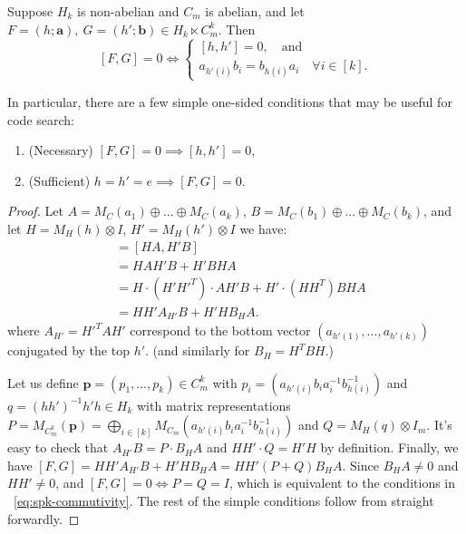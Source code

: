\begin{lemma}\label{lemma:spk-commutivity}
Suppose $H_k$ is non-abelian and $C_m$ is abelian, and let $F=(h;\mathbf a),\ G=(h';\mathbf b)\in H_k\ltimes C_m^{k}$. Then
\begin{equation}\label{eq:spk-commutivity}
[F,G]=0 \iff
\begin{cases}
    [h,h']=0, \quad \text{and} \\
    a_{h'(i)}b_i =b_{h(i)}a_i \quad \forall i\in[k].
\end{cases}
\end{equation}

In particular, there are a few simple one-sided conditions that may be useful for code search:
    \begin{enumerate}
    \item (Necessary) $[F,G]= 0\implies [h,h']= 0$,
    \item (Sufficient) $h=h'=e \implies [F,G]=0$.
    \end{enumerate}
\end{lemma}

\begin{proof}
    Let $A = M_C(a_1)\oplus ...\oplus M_C(a_k)$, $B =M_C(b_1)\oplus ...\oplus M_C(b_k)$, and let $H = M_H(h)\otimes I$, $H' = M_H(h')\otimes I$ we have:
    \begin{align*}
        [F,G] 
        &= [HA , H'B]\\
        &= HAH'B + H'BHA\\
        &= H\cdot(H'{H'}^{T}) \cdot AH' B  + H'\cdot(H  H^T)B HA\\
        &= HH' A_{H'}B + H'H B_HA.
    \end{align*}
    where $A_{H'}={H'}^{T} AH'$ correspond to the bottom vector $(a_{h'(1)},...,a_{h'(k)})$ conjugated by the top $h'$. %
    (and similarly for $B_H = H^TBH$.)

    Let us define $\textbf{p} = (p_1,...,p_k) \in C_m^k $ with $p_i = (a_{h'(i)}b_i a^{-1}_ib^{-1}_{h(i)})$ and $q = (hh')^{-1} h'h\in H_k$ with matrix representations $P = M_{C_m^k}(\textbf{p}) = \bigoplus_{i\in [k]} M_{C_m}(a_{h'(i)}b_i a^{-1}_ib^{-1}_{h(i)})$ and $Q = M_H(q)\otimes I_m$. It's easy to check that $A_{H'}B = P\cdot B_HA$ and $HH'\cdot Q = H'H$ by definition. Finally, we have $ [F,G] = HH' A_{H'}B + H'H B_HA = HH'(P+Q) B_HA$. Since $B_HA \neq 0$ and $HH'\neq 0$, and $[F,G] = 0\iff P = Q = I$, which is equivalent to the conditions in ~\ref{eq:spk-commutivity}. The rest of the simple conditions follow from straight forwardly. 
    
\end{proof}

